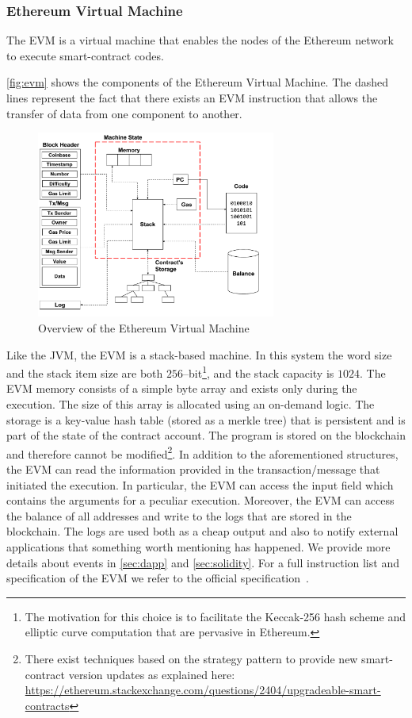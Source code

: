 \subsubsection{Ethereum Virtual Machine}
\label{sec:evm}
The EVM is a virtual machine that enables the nodes of the Ethereum network to
execute smart-contract codes.

\autoref{fig:evm} shows the components of the Ethereum Virtual Machine. The
dashed lines represent the fact that there exists an EVM instruction that allows
the transfer of data from one component to another.
\begin{figure}
	\begin{center}
		\includegraphics[width=0.7\textwidth]
        {./res/img/evm-overview.pdf}
	\end{center}
	\caption{Overview of the Ethereum Virtual Machine}
	\label{fig:evm}
\end{figure}
Like the JVM, the EVM is a stack-based machine. In this system the word size and
the stack item size are both $256$--bit\footnote{The motivation for this choice
is to facilitate the Keccak-256 hash scheme and elliptic curve computation that
are pervasive in Ethereum.}, and the stack capacity is $1024$. The EVM memory
consists of a simple byte array and exists only during the execution. The size
of this array is allocated using an on-demand logic. The storage is a key-value
hash table (stored as a merkle tree) that is persistent and is part of the state
of the contract account. The program is stored on the blockchain and therefore
cannot be modified\footnote{There exist techniques based on the strategy pattern
to provide new smart-contract version updates as explained here:
\url{https://ethereum.stackexchange.com/questions/2404/upgradeable-smart-contracts}}.
In addition to the aforementioned structures, the EVM can read the information
provided in the transaction/message that initiated the execution. In particular,
the EVM can access the input field which contains the arguments for a peculiar
execution. Moreover, the EVM can access the balance of all addresses and write
to the logs that are stored in the blockchain. The logs are used both as a cheap
output and also to notify external applications that something worth mentioning
has happened. We provide more details about events in \autoref{sec:dapp} and
\autoref{sec:solidity}. For a full instruction list and specification of the EVM
we refer to the official specification~\cite[Appendix H]{wood2018ethereum}.

